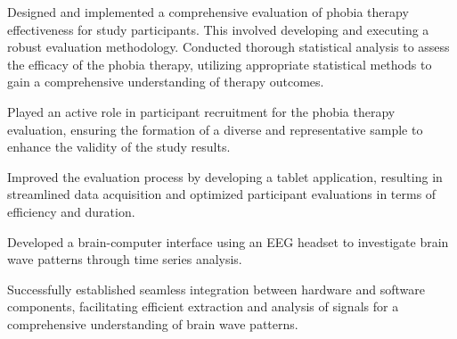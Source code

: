 \documentclass[]{plushcv}
\begin{document}
\begin{minipage}[t]{0.25\textwidth}
\sectionsep
{}
\sectionsep

\sectionsep
\runsubsection{}
\sectionsep
\sectionsep

\end{minipage} 

\clearpage
\begin{minipage}[t]{0.70\textwidth} 
\sectionsep
\sectionsep
\sectionsep
\sectionsep
\sectionsep
\sectionsep
\sectionsep
\sectionsep





\begin{tightemize}
\sectionsep
\item Designed and implemented a comprehensive evaluation of phobia therapy effectiveness for study participants. This involved developing and executing a robust evaluation methodology.
Conducted thorough statistical analysis to assess the efficacy of the phobia therapy, utilizing appropriate statistical methods to gain a comprehensive understanding of therapy outcomes.
\item Played an active role in participant recruitment for the phobia therapy evaluation, ensuring the formation of a diverse and representative sample to enhance the validity of the study results.
\item Improved the evaluation process by developing a tablet application, resulting in streamlined data acquisition and optimized participant evaluations in terms of efficiency and duration.
\end{tightemize}
\sectionsep


\begin{tightemize}
\sectionsep
\item Developed a brain-computer interface using an EEG headset to investigate brain wave patterns through time series analysis.
\item Successfully established seamless integration between hardware and software components, facilitating efficient extraction and analysis of signals for a comprehensive understanding of brain wave patterns.
\end{tightemize}


\end{minipage}
\end{document}
